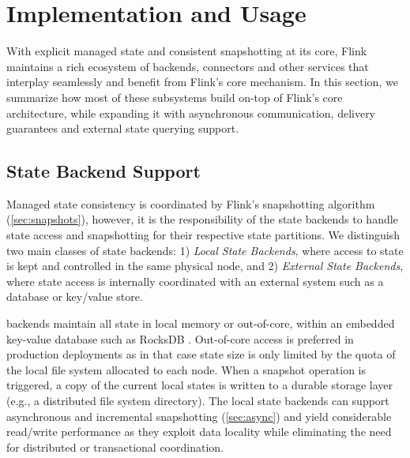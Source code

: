 

\section{Implementation and Usage}

With explicit managed state and consistent snapshotting at its core, Flink maintains a rich ecosystem of backends, connectors and other services that interplay seamlessly and benefit from Flink's core mechanism. In this section, we summarize how most of these subsystems build on-top of Flink's core architecture, while expanding it with asynchronous communication, delivery guarantees and external state querying support.

\label{sec:implementation}

\subsection{State Backend Support}

Managed state consistency is coordinated by Flink's snapshotting algorithm (\autoref{sec:snapshots}), however, it is the responsibility of the state backends to handle state access and snapshotting for their respective state partitions. We distinguish two main classes of state backends: 1) \emph{Local State Backends}, where access to state is kept and controlled in the same physical node, and 2) \emph{External State Backends}, where state access is internally coordinated with an external system such as a database or key/value store.

 backends maintain all state in local memory or out-of-core, within an embedded key-value database such as RocksDB \cite{CUSTOM:web/rocksdb}. Out-of-core access is preferred in production deployments as in that case state size is only limited by the quota of the local file system allocated to each node. When a snapshot operation is triggered, a copy of the current local states is written to a durable storage layer (e.g., a distributed file system directory). The local state backends can support asynchronous and incremental snapshotting (\autoref{sec:async}) and yield considerable read/write performance as they exploit data locality while eliminating the need for distributed or transactional coordination.

